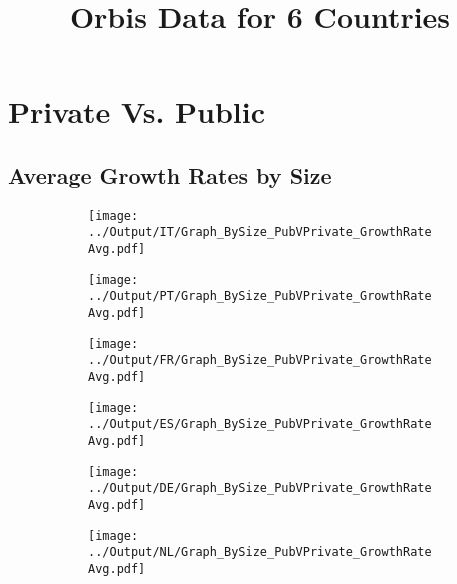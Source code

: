 \documentclass[12pt,notitlepage]{article}
\title{Orbis Data for 6 Countries}
\author{}
\date{}
\begin{document}
\maketitle
\tableofcontents
\pagebreak



\FloatBarrier
\section{Private Vs. Public} %
\label{sec:private_vs_public}
\FloatBarrier


\subsection{Average Growth Rates by Size}
\begin{figure}[!htpb]
\centering
\begin{subfigure}{.49\textwidth}
    \centering
 \texttt{[image: ../Output/IT/Graph\_BySize\_PubVPrivate\_GrowthRateAvg.pdf]}
\end{subfigure}%
\begin{subfigure}{.49\textwidth}
    \centering
 \texttt{[image: ../Output/PT/Graph\_BySize\_PubVPrivate\_GrowthRateAvg.pdf]}
\end{subfigure}
\begin{subfigure}{.49\textwidth}
    \centering
 \texttt{[image: ../Output/FR/Graph\_BySize\_PubVPrivate\_GrowthRateAvg.pdf]}
\end{subfigure}%
\begin{subfigure}{.49\textwidth}
    \centering
 \texttt{[image: ../Output/ES/Graph\_BySize\_PubVPrivate\_GrowthRateAvg.pdf]}
\end{subfigure}
\begin{subfigure}{.49\textwidth}
    \centering
 \texttt{[image: ../Output/DE/Graph\_BySize\_PubVPrivate\_GrowthRateAvg.pdf]}
\end{subfigure}
\begin{subfigure}{.49\textwidth}
    \centering
 \texttt{[image: ../Output/NL/Graph\_BySize\_PubVPrivate\_GrowthRateAvg.pdf]}
\end{subfigure}
\end{figure}
\end{document}
